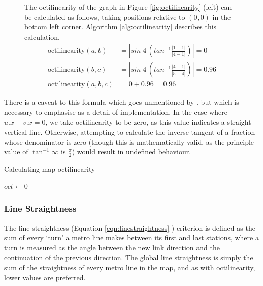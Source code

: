 \begin{figure}[h]
\begin{minipage}{.55\textwidth}
The octilinearity of the graph in Figure \ref{fig:octilinearity} (left) can be calculated as follows, taking positions relative to $(0, 0)$ in the bottom left corner. Algorithm \ref{alg:octilinearity} describes this calculation.
$$\begin{aligned}
\text{octilinearity}(a, b) &= |sin\;4\,(tan^{-1}\frac{|1 - 1|}{|4 - 1|})| = 0 \\
\text{octilinearity}(b, c) &= |sin\;4\,(tan^{-1}\frac{|4 - 1|}{|5 - 4|})| = 0.96 \\[0.1cm]
\text{octilinearity}(a, b, c) &= 0 + 0.96 = 0.96
\end{aligned}$$
\end{minipage}
\end{figure}

There is a caveat to this formula which goes unmentioned by \citeauthor{AutomaticMetroMapLayoutThesis}, but which is necessary to emphasise as a detail of implementation. In the case where $u.x - v.x = 0$, we take octilinearity to be zero, as this value indicates a straight vertical line. Otherwise, attempting to calculate the inverse tangent of a fraction whose denominator is zero (though this is mathematically valid, as the principle value of $\tan^{-1}\infty$ is $\frac{\pi}{2}$) would result in undefined behaviour.\\

\begin{algorithm}
\label{alg:octilinearity}
 \caption{Calculating map octilinearity}
 $oct \gets 0$ \;
\end{algorithm}

\subsubsection{Line Straightness}

The line straightness (Equation \ref{eqn:linestraightness} \citep{AutomaticMetroMapLayoutThesis}) criterion is defined as the sum of every `turn' a metro line makes between its first and last stations, where a turn is measured as the angle between the new link direction and the continuation of the previous direction. The global line straightness is simply the sum of the straightness of every metro line in the map, and as with octilinearity, lower values are preferred.

